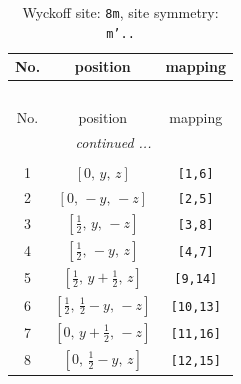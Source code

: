 \documentclass[fleqn,8pt]{jsarticle}
\begin{document}
\begin{longtable}{ccc}
\caption{Wyckoff site: {\tt 8m}, site symmetry: {\tt m'..}}
 \\
 \hline \hline
No. & position & mapping \\ \hline \endfirsthead

\multicolumn{2}{l}{\tablename\ \thetable{}} \\
 \hline \hline
No. & position & mapping \\ \hline \endhead

 \hline \hline
\multicolumn{2}{r}{\footnotesize\it continued ...} \\ \endfoot

 \hline \hline
\multicolumn{2}{r}{} \\ \endlastfoot

1 & $\left[ 0,\, y,\, z \right]$ & {\tt [1,6]} \\ \hline
2 & $\left[ 0,\, - y,\, - z \right]$ & {\tt [2,5]} \\ \hline
3 & $\left[ \frac{1}{2},\, y,\, - z \right]$ & {\tt [3,8]} \\ \hline
4 & $\left[ \frac{1}{2},\, - y,\, z \right]$ & {\tt [4,7]} \\ \hline
5 & $\left[ \frac{1}{2},\, y + \frac{1}{2},\, z \right]$ & {\tt [9,14]} \\ \hline
6 & $\left[ \frac{1}{2},\, \frac{1}{2} - y,\, - z \right]$ & {\tt [10,13]} \\ \hline
7 & $\left[ 0,\, y + \frac{1}{2},\, - z \right]$ & {\tt [11,16]} \\ \hline
8 & $\left[ 0,\, \frac{1}{2} - y,\, z \right]$ & {\tt [12,15]} \\
\end{longtable}
\renewcommand{\arraystretch}{1.2}
\end{document}
